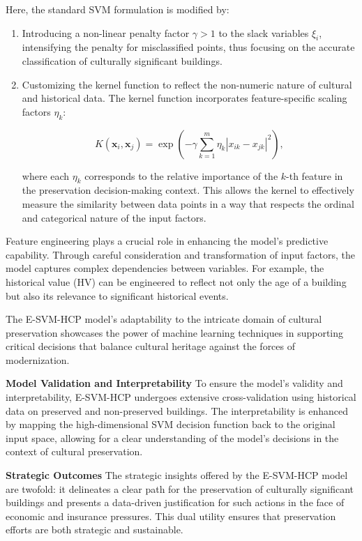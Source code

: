\documentclass{mcmthesis}
\begin{document}
Here, the standard SVM formulation is modified by:
\begin{enumerate}
    \item Introducing a non-linear penalty factor $\gamma > 1$ to the slack variables $\xi_i$, intensifying the penalty for misclassified points, thus focusing on the accurate classification of culturally significant buildings.
    
    \item Customizing the kernel function to reflect the non-numeric nature of cultural and historical data. The kernel function incorporates feature-specific scaling factors $\eta_k$:
    
    \begin{equation}
    K(\mathbf{x}_i, \mathbf{x}_j) = \exp\left(-\gamma \sum_{k=1}^{m} \eta_k |x_{ik} - x_{jk}|^2\right),
    \end{equation}
    
    where each $\eta_k$ corresponds to the relative importance of the $k$-th feature in the preservation decision-making context. This allows the kernel to effectively measure the similarity between data points in a way that respects the ordinal and categorical nature of the input factors.
\end{enumerate}

Feature engineering plays a crucial role in enhancing the model's predictive capability. Through careful consideration and transformation of input factors, the model captures complex dependencies between variables. For example, the historical value (HV) can be engineered to reflect not only the age of a building but also its relevance to significant historical events.

The E-SVM-HCP model's adaptability to the intricate domain of cultural preservation showcases the power of machine learning techniques in supporting critical decisions that balance cultural heritage against the forces of modernization.

\textbf{Model Validation and Interpretability}
To ensure the model's validity and interpretability, E-SVM-HCP undergoes extensive cross-validation using historical data on preserved and non-preserved buildings. The interpretability is enhanced by mapping the high-dimensional SVM decision function back to the original input space, allowing for a clear understanding of the model's decisions in the context of cultural preservation.

\textbf{Strategic Outcomes}
The strategic insights offered by the E-SVM-HCP model are twofold: it delineates a clear path for the preservation of culturally significant buildings and presents a data-driven justification for such actions in the face of economic and insurance pressures. This dual utility ensures that preservation efforts are both strategic and sustainable.
\end{document}
